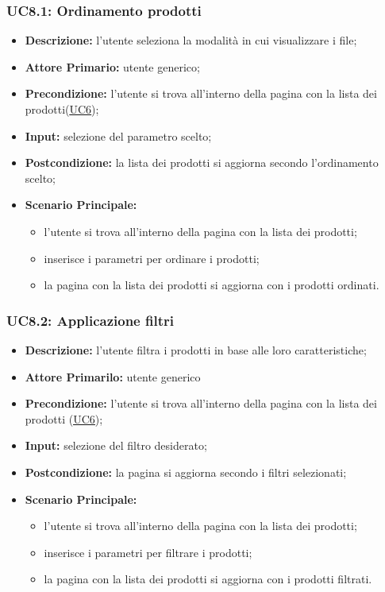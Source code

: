         \subsubsection{UC8.1: Ordinamento prodotti}
        \label{sec:UC8.1}
        \begin{itemize}
            \item \textbf{Descrizione:} l'utente seleziona la modalità in cui visualizzare i file;
            \item \textbf{Attore Primario:} utente generico;
            \item \textbf{Precondizione:} l'utente si trova all'interno della pagina con la lista dei prodotti(\hyperref[sec:UC6]{\underline{UC6}});
            \item \textbf{Input:} selezione del parametro scelto;
            \item \textbf{Postcondizione:} la lista dei prodotti si aggiorna secondo l'ordinamento scelto;
            \item \textbf{Scenario Principale:}
            \begin{itemize}
                \item l'utente si trova all'interno della pagina con la lista dei prodotti;
                \item inserisce i parametri per ordinare i prodotti;
                \item la pagina con la lista dei prodotti si aggiorna con i prodotti ordinati.
            \end{itemize}
        \end{itemize}
        \subsubsection{UC8.2: Applicazione filtri}
        \label{sec:UC8.2}
        \begin{itemize}
            \item \textbf{Descrizione:} l'utente filtra i prodotti in base alle loro caratteristiche;
            \item \textbf{Attore Primarilo:} utente generico
            \item \textbf{Precondizione:} l'utente si trova all'interno della pagina con la lista dei prodotti (\hyperref[sec:UC6]{\underline{UC6}});
            \item \textbf{Input:} selezione del filtro desiderato;
            \item \textbf{Postcondizione:} la pagina si aggiorna secondo i filtri selezionati;
            \item \textbf{Scenario Principale:}
            \begin{itemize}
                \item l'utente si trova all'interno della pagina con la lista dei prodotti;
                \item inserisce i parametri per filtrare i prodotti;
                \item la pagina con la lista dei prodotti si aggiorna con i prodotti filtrati.
            \end{itemize}
        \end{itemize}